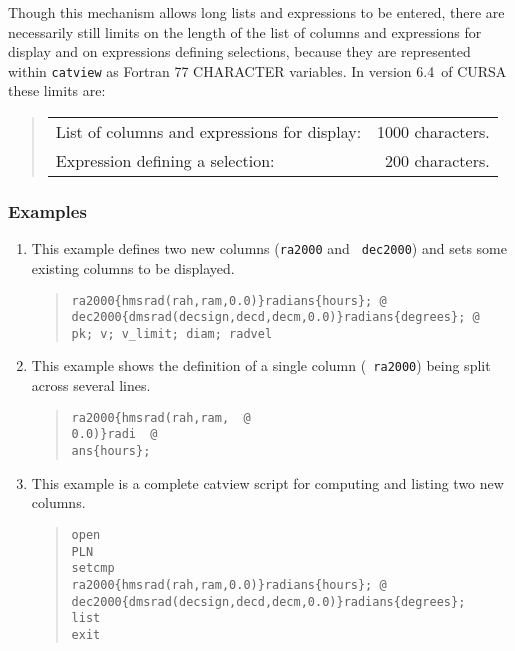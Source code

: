 \documentclass[twoside,11pt]{article}
\newcommand{\CURSAversion}{6.4~}
\renewcommand{\_}{\texttt{\symbol{95}}}
\begin{document}
Though this mechanism allows long lists and expressions to be entered,
there are necessarily still limits on the length of the list of columns and
expressions for display and on expressions defining selections, because
they are represented within {\tt catview} as Fortran 77 CHARACTER variables.
In version \CURSAversion of CURSA these limits are:

\begin{quote}
\begin{tabular}{lr}
List of columns and expressions for display: &  1000 characters. \\
Expression defining a selection:             &   200 characters. \\
\end{tabular}
\end{quote}

\subsubsection{Examples}

\begin{enumerate}

  \item This example defines two new columns ({\tt ra2000} and {\tt
   dec2000}) and sets some existing columns to be displayed.

  \begin{quote}
  \verb+ra2000{hmsrad(rah,ram,0.0)}radians{hours}; @               + \\
  \verb+dec2000{dmsrad(decsign,decd,decm,0.0)}radians{degrees}; @  + \\
  \verb+pk; v; v_limit; diam; radvel                               +
  \end{quote}

  \item This example shows the definition of a single column ({\tt
   ra2000}) being split across several lines.

  \begin{quote}
  \verb+ra2000{hmsrad(rah,ram,  @ + \\
  \verb+0.0)}radi  @              + \\
  \verb+ans{hours};               +
  \end{quote}

  \item This example is a complete catview script for computing and
   listing two new columns.

  \begin{quote}
  \verb+open     + \\
  \verb+PLN      + \\
  \verb+setcmp   + \\
  \verb+ra2000{hmsrad(rah,ram,0.0)}radians{hours}; @            + \\
  \verb+dec2000{dmsrad(decsign,decd,decm,0.0)}radians{degrees}; + \\
  \verb+list     + \\
  \verb+exit     +
  \end{quote}

\end{enumerate}
\end{document}
